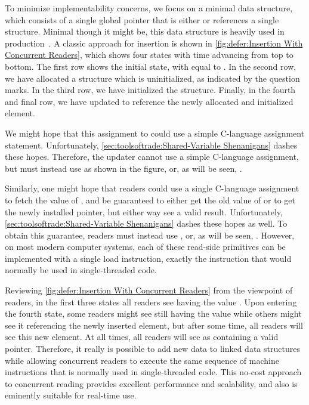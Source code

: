 To minimize implementability concerns, we focus on a minimal
data structure, which consists of a single global pointer that is either
 or references a single structure.
Minimal though it might be, this data structure is heavily used in
production~\cite{GeoffRomer2018C++DeferredReclamationP0561R4}.
A classic approach for insertion is shown in
\cref{fig:defer:Insertion With Concurrent Readers},
which shows four states with time advancing from top to bottom.
The first row shows the initial state, with  equal to .
In the second row, we have allocated a structure which is uninitialized,
as indicated by the question marks.
In the third row, we have initialized the structure.
Finally, in the fourth and final row, we have updated  to
reference the newly allocated and initialized element.

We might hope that this assignment to  could use a simple
C-language assignment statement.
Unfortunately,
\cref{sec:toolsoftrade:Shared-Variable Shenanigans}
dashes these hopes.
Therefore, the updater cannot use a simple C-language assignment, but
must instead use  as shown in the figure,
or, as will be seen, .

Similarly, one might hope that readers could use a single C-language
assignment to fetch the value of , and be guaranteed to either
get the old value of  or to get the newly installed pointer,
but either way see a valid result.
Unfortunately, \cref{sec:toolsoftrade:Shared-Variable Shenanigans}
dashes these hopes as well.
To obtain this guarantee, readers must instead use ,
or, as will be seen, .
However, on most modern computer systems, each of these read-side primitives
can be implemented with a single load instruction, exactly the instruction
that would normally be used in single-threaded code.

Reviewing \cref{fig:defer:Insertion With Concurrent Readers}
from the viewpoint of readers, in the first three states all readers
see  having the value .
Upon entering the fourth state, some readers might see  still
having the value  while others might see it referencing the
newly inserted element, but after some time, all readers will see this
new element.
At all times, all readers will see  as containing a valid pointer.
Therefore, it really is possible to add new data to linked data structures
while allowing concurrent readers to execute the same sequence of machine
instructions that is normally used in single-threaded code.
This no-cost approach to concurrent reading provides excellent performance
and scalability, and also is eminently suitable for real-time use.

